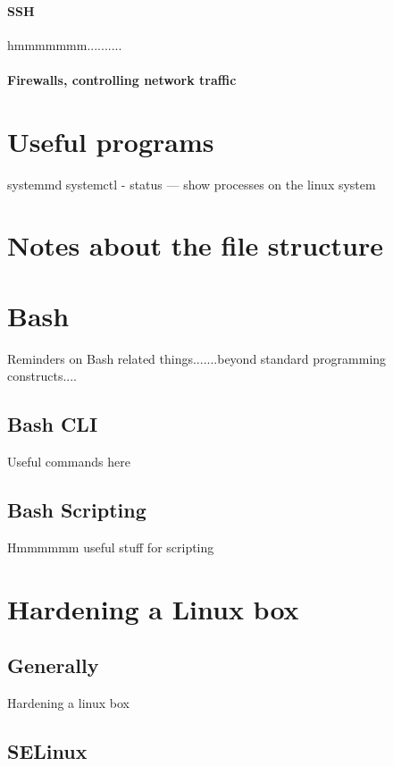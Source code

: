 \documentclass[a4paper, 11pt]{book}
\begin{document}
    \paragraph{SSH}
    hmmmmmmm..........

    \paragraph{Firewalls, controlling network traffic}


    \section{Useful programs}
    systemmd
    systemctl - status --- show processes on the linux system


    \section{Notes about the file structure}


    \section{Bash}
    Reminders on Bash related things.......beyond standard programming constructs....

    \subsection{Bash CLI}
    Useful commands here

    \subsection{Bash Scripting}
    Hmmmmmm useful stuff for scripting


    \section{Hardening a Linux box}

    \subsection{Generally}
    Hardening a linux box

    \subsection{SELinux}
\end{document}
